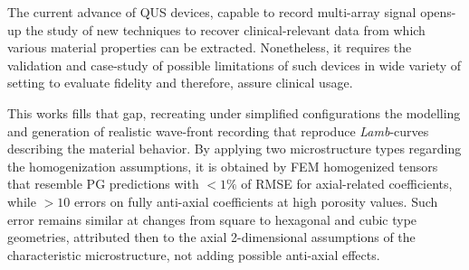 \begin{conclusion}




The current advance of QUS devices, capable to record multi-array signal opens-up the study of new techniques to recover clinical-relevant data from which various material properties can be extracted. Nonetheless, it requires the validation and case-study of possible limitations of such devices in wide variety of setting to evaluate fidelity and therefore, assure clinical usage.

This works fills that gap, recreating under simplified configurations the modelling and generation of realistic wave-front recording that reproduce \textit{Lamb}-curves describing the material behavior.
By applying two microstructure types regarding the homogenization assumptions, it is obtained by FEM homogenized tensors that resemble PG predictions with $< 1 \%$ of RMSE for axial-related coefficients, while $> 10$ errors on fully anti-axial coefficients at high porosity values. Such error remains similar at changes from square to hexagonal and cubic type geometries, attributed then to the axial 2-dimensional assumptions of the characteristic microstructure, not adding possible anti-axial effects.


\end{conclusion}
